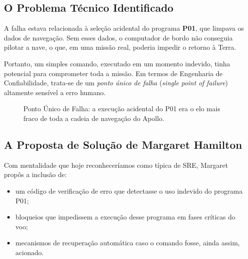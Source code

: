 \documentclass[12pt,a4paper]{report}
\begin{document}
\subsection{O Problema Técnico Identificado}

A falha estava relacionada à seleção acidental do programa \textbf{P01}, que
limpava os dados de navegação. Sem esses dados, o computador de bordo não
conseguia pilotar a nave, o que, em uma missão real, poderia impedir o retorno
à Terra.

Portanto, um simples comando, executado em um momento indevido, tinha
potencial para comprometer toda a missão. Em termos de Engenharia de
Confiabilidade, trata-se de um \emph{ponto único de falha} (\emph{single point
of failure}) altamente sensível a erro humano.

\begin{figure}[h]
    \centering
    \caption{Ponto Único de Falha: a execução acidental do P01 era o elo mais fraco de toda a cadeia de navegação do Apollo.}
\end{figure}

\subsection{A Proposta de Solução de Margaret Hamilton}

Com mentalidade que hoje reconheceríamos como típica de SRE, Margaret
propôs a inclusão de:
\begin{itemize}[nosep]
    \item um código de verificação de erro que detectasse o uso indevido
    do programa P01;
    \item bloqueios que impedissem a execução desse programa em fases
    críticas do voo;
    \item mecanismos de recuperação automática caso o comando fosse, ainda
    assim, acionado.
\end{itemize}
\end{document}
